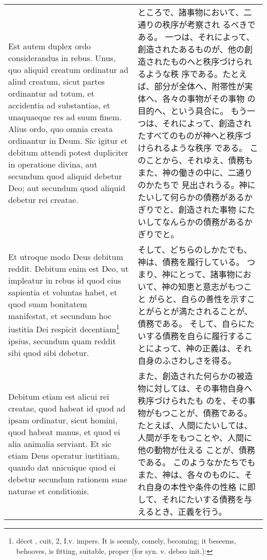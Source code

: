 \documentclass[10pt]{jsarticle} %
\begin{document}
{\begin{longtable}{p{21em}p{21em}}
\\

Est autem duplex
ordo considerandus in rebus. 
Unus, quo aliquid creatum ordinatur ad
aliud creatum, sicut partes ordinantur ad totum, et accidentia ad
substantias, et unaquaeque res ad suum finem. Alius ordo, quo omnia
creata ordinantur in Deum. Sic igitur et debitum attendi potest
dupliciter in operatione divina, aut secundum quod aliquid debetur Deo;
aut secundum quod aliquid debetur rei creatae. 


&

ところで、諸事物において、二通りの秩序が考察され
るべきである。
一つは、それによって、創造されたあるものが、他の創造されたものへと秩序づけられるような秩
 序である。たとえば、部分が全体へ、附帯性が実体へ、各々の事物がその事物
 の目的へ、という具合に。
もう一つは、それによって、創造されたすべてのものが神へと秩序づけられるような秩序
 である。
このことから、それゆえ、債務もまた、神の働きの中に、二通りのかたちで
 見出されうる。神にたいして何らかの債務があるかぎりでと、創造された事物
 にたいしてなんらかの債務があるかぎりでと。


\\

Et utroque modo Deus
debitum reddit. Debitum enim est Deo, ut impleatur in rebus id quod eius
sapientia et voluntas habet, et quod suam bonitatem manifestat, et
secundum hoc iustitia Dei respicit decentiam\footnote{d\u{e}cet , cuit, 2,
I.v. impers. It is seemly, comely, becoming; it beseems, behooves, is fitting, suitable, proper (for syn. v. debeo init.):} ipsius, secundum quam
reddit sibi quod sibi debetur. 


&

そして、どちらのしかたでも、神は、債務を履行している。
つまり、神にとって、諸事物において、神の知恵と意志がもつこと
 がらと、自らの善性を示すことがらとが満たされることが、債務である。
 そして、自らにたいする債務を自らに履行することによって、神の正義は、それ
 自身のふさわしさを得る。


\\

Debitum etiam est alicui rei creatae,
quod habeat id quod ad ipsam ordinatur, sicut homini, quod habeat manus,
et quod ei alia animalia serviant. 
Et sic etiam Deus operatur iustitiam,
quando dat unicuique quod ei debetur secundum rationem suae naturae et
conditionis.

&

また、創造された何らかの被造物に対しては、その事物自身へ秩序づけられたも
 のを、その事物がもつことが、債務である。
たとえば、人間にたいしては、人間が手をもつことや、人間に他の動物が仕える
 ことが、債務である。
このようなかたちでもまた、神は、各々のものに、それ自身の本性や条件の性格
 に即して、それにたいする債務を与えるとき、正義を行う。



\end{longtable}}
\end{document}
